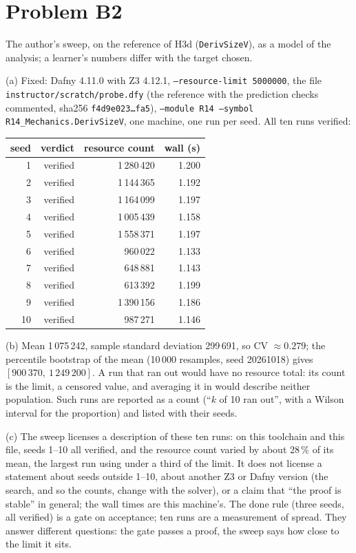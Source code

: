 \documentclass[11pt]{article}
\begin{document}
\section*{Problem B2}\label{ans:B2}
\begin{answer}
The author's sweep, on the reference of H3d (\texttt{DerivSizeV}), as a model of the
analysis; a learner's numbers differ with the target chosen.

(a) Fixed: Dafny 4.11.0 with Z3 4.12.1, \texttt{--resource-limit 5000000}, the
file \texttt{instructor/scratch/probe.dfy} (the reference with the prediction
checks commented, sha256 \texttt{f4d9e023\ldots fa5}), \texttt{--module R14
--symbol R14\_Mechanics.DerivSizeV}, one machine, one run per seed. All ten runs
verified:

\begin{tabular}{rrrr}
seed & verdict & resource count & wall (s)\\\hline
1 & verified & 1\,280\,420 & 1.200\\
2 & verified & 1\,144\,365 & 1.192\\
3 & verified & 1\,164\,099 & 1.197\\
4 & verified & 1\,005\,439 & 1.158\\
5 & verified & 1\,558\,371 & 1.197\\
6 & verified & 960\,022 & 1.133\\
7 & verified & 648\,881 & 1.143\\
8 & verified & 613\,392 & 1.199\\
9 & verified & 1\,390\,156 & 1.186\\
10 & verified & 987\,271 & 1.146\\
\end{tabular}

(b) Mean 1\,075\,242, sample standard deviation 299\,691, so CV $\approx 0.279$;
the percentile bootstrap of the mean (10\,000 resamples, seed 20261018) gives
$[900\,370,\ 1\,249\,200]$. A run that ran out would have no resource total:
its count is the limit, a censored value, and averaging it in would describe
neither population. Such runs are reported as a count (``$k$ of 10 ran out'',
with a Wilson interval for the proportion) and listed with their seeds.

(c) The sweep licenses a description of these ten runs: on this toolchain and
this file, seeds 1--10 all verified, and the resource count varied by about
28\,\% of its mean, the largest run using under a third of the limit. It does
not license a statement about seeds outside 1--10, about another Z3 or Dafny
version (the search, and so the counts, change with the solver), or a claim
that ``the proof is stable'' in general; the wall times are this machine's.
The done rule (three seeds, all verified) is a gate on acceptance; ten runs are
a measurement of spread. They answer different questions: the gate passes a
proof, the sweep says how close to the limit it sits.


\end{answer}
\end{document}

